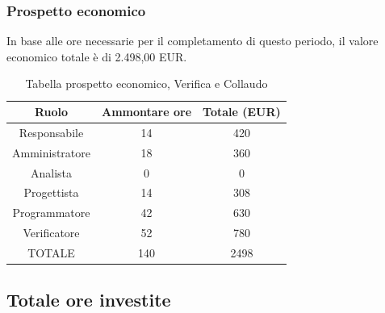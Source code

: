 \subsubsection{Prospetto economico}
In base alle ore necessarie per il completamento di questo periodo, il valore economico totale è di 2.498,00 EUR.
\begin{table}[h]
\caption{Tabella prospetto economico, Verifica e Collaudo}
\begin{center}
\begin{tabular}{ |c|c|c|  }
 \hline
 Ruolo 		& Ammontare ore 	& Totale (EUR)\\
 \hline
 \hline
 	Responsabile	& 14 	& 420\\
	Amministratore	& 18		& 360\\
	Analista		& 0 		& 0\\
	Progettista		& 14		& 308\\
	Programmatore	& 42		& 630\\
	Verificatore	& 52 	& 780\\
 \hline\hline
 TOTALE		& 140		& 2498\\
  \hline
\end{tabular}
\end{center}
\end{table}
\newpage
\subsection{Totale ore investite}
